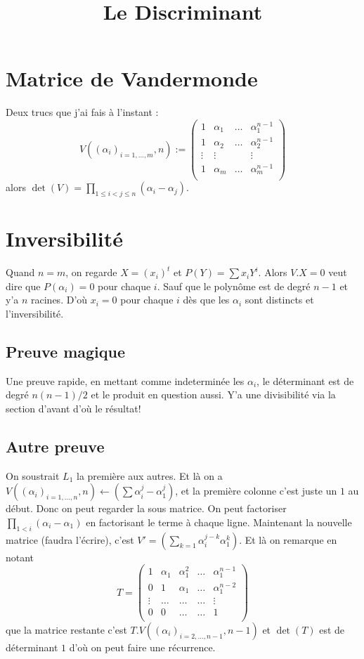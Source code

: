 \documentclass[a4paper,12pt]{book}
\title{Le Discriminant}
\date{}
\theoremstyle{plain}
\theoremstyle{definition}
\theoremstyle{remark}
\begin{document}
\maketitle
\section{Matrice de Vandermonde}
Deux trucs que j'ai fais à l'instant : 
\[V((\alpha_i)_{i=1,\ldots,m},n):=\begin{pmatrix}1&\alpha_1&\ldots&\alpha_1^{n-1}\\
    1&\alpha_2&\ldots&\alpha_2^{n-1}\\
    \vdots&\vdots&&\vdots\\
    1&\alpha_m&\ldots&\alpha_m^{n-1}\\
\end{pmatrix}\]
alors $\det(V)=\prod_{1\leq i<j\leq n} (\alpha_i-\alpha_j)$.
\section{Inversibilité}
Quand $n=m$, on regarde $X=(x_i)^t$ et $P(Y)=\sum x_iY^i$.
Alors $V.X=0$ veut dire que $P(\alpha_i)=0$ pour chaque $i$.
Sauf que le polynôme est de degré $n-1$ et y'a $n$ racines.
D'où $x_i=0$ pour chaque $i$ dès que les $\alpha_i$ sont 
distincts et l'inversibilité.

\subsection{Preuve magique}
Une preuve rapide, en mettant comme indeterminée les $\alpha_i$,
le déterminant est de degré $n(n-1)/2$ et le produit en
question aussi. Y'a une divisibilité via la section d'avant d'où
le résultat!

\subsection{Autre preuve}
On soustrait $L_1$ la première aux autres. Et là on a
$V((\alpha_i)_{i=1,\ldots,n},n)\leftarrow(\sum \alpha_i^j-\alpha_1^j)$,
et la première colonne c'est juste un $1$ au début. Donc on peut
regarder la sous matrice. On peut factoriser $\prod_{1<i} (\alpha_i-\alpha_1)$
en factorisant le terme à chaque ligne. Maintenant la nouvelle
matrice (faudra l'écrire), c'est $V'=(\sum_{k=1}\alpha_i^{j-k}\alpha_1^k)$. 
Et là on remarque en notant 
    \[T=\begin{pmatrix}1&\alpha_1&\alpha_1^2&\ldots&\alpha_1^{n-1}\\
        0&1&\alpha_1&\ldots&\alpha_1^{n-2}\\
        \vdots&\ldots&\ldots&\ldots&\vdots\\
        0&0&\ldots&\ldots&1\\
    \end{pmatrix}
    \]
que la matrice restante c'est $T.V((\alpha_i)_{i=2,\ldots,n-1},n-1)$
et $\det(T)$ est de déterminant $1$ d'où on peut faire une récurrence.
\end{document}
